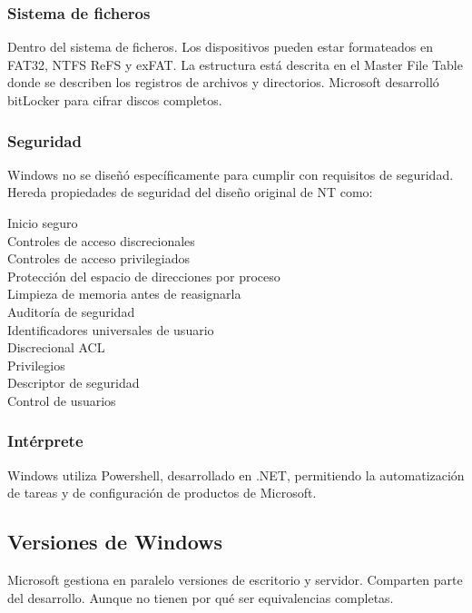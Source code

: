     \subsubsection{Sistema de ficheros}
        Dentro del sistema de ficheros. Los dispositivos pueden estar formateados en FAT32, NTFS ReFS y exFAT.
        La estructura está descrita en el Master File Table donde se describen los registros de archivos y directorios. Microsoft desarrolló bitLocker para cifrar discos completos.

    \subsubsection{Seguridad}
        Windows no se diseñó específicamente para cumplir con requisitos de seguridad. Hereda propiedades de seguridad del diseño original de NT como:
        \begin{description}
            \item[Inicio seguro]
            \item[Controles de acceso discrecionales]
            \item[Controles de acceso privilegiados]
            \item[Protección del espacio de direcciones por proceso]
            \item[Limpieza de memoria antes de reasignarla]
            \item[Auditoría de seguridad]
            \item[Identificadores universales de usuario]
            \item[Discrecional ACL]
            \item[Privilegios]
            \item[Descriptor de seguridad]
            \item[Control de usuarios] 
        \end{description}

    \subsubsection{Intérprete}
        Windows utiliza Powershell, desarrollado en .NET, permitiendo la automatización de tareas y de configuración de productos de Microsoft.


\subsection{Versiones de Windows}
    Microsoft gestiona en paralelo versiones de escritorio y servidor. Comparten parte del desarrollo. Aunque no tienen por qué ser equivalencias completas.

